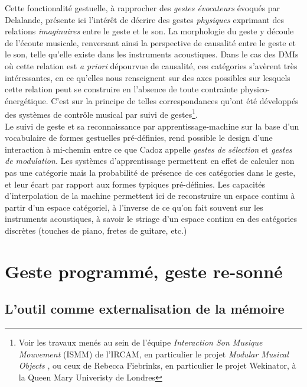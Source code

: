 \indent Cette fonctionalité gestuelle, à rapprocher des \textit{gestes évocateurs} évoqués par Delalande, présente ici l'intérêt de décrire des gestes \textit{physiques} exprimant des relations \textit{imaginaires} entre le geste et le son. La morphologie du geste y découle de l'écoute musicale, renversant ainsi la perspective de causalité entre le geste et le son, telle qu'elle existe dans les instruments acoustiques. Dans le cas des \glspl{DMI} où cette relation est \textit{a priori} dépourvue de causalité, ces catégories s'avèrent très intéressantes, en ce qu'elles nous renseignent sur des axes possibles sur lesquels cette relation peut se construire en l'absence de toute contrainte physico-énergétique. C'est sur la principe de telles correspondances qu'ont été développés des systèmes de contrôle musical par suivi de gestes\footnote{Voir les travaux menés au sein de l'équipe \textit{Interaction Son Musique Mouvement} (ISMM) de l'\gls{IRCAM}, en particulier le projet \textit{Modular Musical Objects} \cite{caramiaux_mapping_2014, francoise_motion-sound_2015}, ou ceux de Rebecca Fiebrinks, en particulier le projet Wekinator, \cite{fiebrink_wekinator:_2010} à la Queen Mary Univeristy de Londres}.\\
\indent Le suivi de geste et sa reconnaissance par apprentissage-machine sur la base d'un vocabulaire de formes gestuelles pré-définies, rend possible le design d'une interaction à mi-chemin entre ce que Cadoz appelle \textit{gestes de sélection} et \textit{gestes de modulation}. Les systèmes d'apprentissage permettent en effet de calculer non pas une catégorie mais la probabilité de présence de ces catégories dans le geste, et leur écart par rapport aux formes typiques pré-définies. Les capacités d'interpolation de la machine permettent ici de reconstruire un espace continu à partir d'un espace catégoriel, à l'inverse de ce qu'on fait souvent sur les instruments acoustiques, à savoir le striage d'un espace continu en des catégories discrètes (touches de piano, fretes de guitare, etc.)




\section{Geste programmé, geste re-sonné}
\label{sec:gesture:instrumental_to_musical}
\subsection{L'outil comme externalisation de la mémoire}
\label{sec:gesture:instrumental_to_musical:externalisation}

